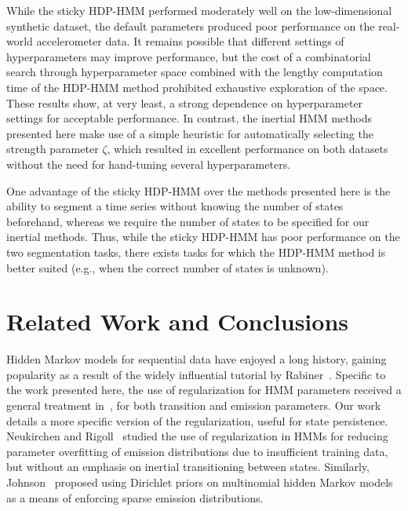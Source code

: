 \documentclass[letterpaper]{article}
\begin{document}
While the sticky HDP-HMM performed moderately well on the low-dimensional synthetic dataset, the default parameters produced poor performance on the real-world accelerometer data. It remains possible that different settings of hyperparameters may improve performance, but the cost of a combinatorial search through hyperparameter space combined with the lengthy computation time of the HDP-HMM method prohibited exhaustive exploration of the space. These results show, at very least, a strong dependence on hyperparameter settings for acceptable performance. In contrast, the inertial HMM methods presented here make use of a simple heuristic for automatically selecting the strength parameter $\zeta$, which resulted in excellent performance on both datasets without the need for hand-tuning several hyperparameters. 

One advantage of the sticky HDP-HMM over the methods presented here is the ability to segment a time series without knowing the number of states beforehand, whereas we require the number of states to be specified for our inertial methods. Thus, while the sticky HDP-HMM has poor performance on the two segmentation tasks, there exists tasks for which the HDP-HMM method is better suited (e.g., when the correct number of states is unknown).

\section{Related Work and Conclusions}

Hidden Markov models for sequential data have enjoyed a long history, gaining popularity as a result of the widely influential tutorial by Rabiner~\cite{rabiner1989tutorial}. Specific to the work presented here, the use of regularization for HMM parameters received a general treatment in~\cite{MAP1994}, for both transition and emission parameters. Our work details a more specific version of the regularization, useful for state persistence. Neukirchen and Rigoll~\cite{neukirchen1999controlling} studied the use of regularization in HMMs for reducing parameter overfitting of emission distributions due to insufficient training data, but without an emphasis on inertial transitioning between states. Similarly, Johnson~\cite{Johnson07whydoesnt} proposed using Dirichlet priors on multinomial hidden Markov models as a means of enforcing sparse emission distributions. 
\end{document}
